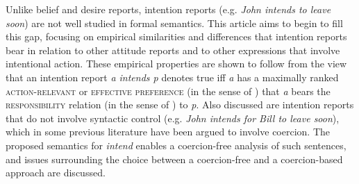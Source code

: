 Unlike belief and desire reports, intention reports (e.g. \textit{John intends to leave soon}) are not well studied in formal semantics. This article aims to begin to fill this gap, focusing on empirical similarities and differences that intention reports bear in relation to other attitude reports and to other expressions that involve intentional action. These empirical properties are shown to follow from the view that an intention report \textit{a intends p} denotes true iff \textit{a} has a maximally ranked \textsc{action-relevant} or \textsc{effective preference} (in the sense of \cite{condoravdi-lauer2016-semprag}) that \textit{a} bears the \textsc{responsibility} relation (in the sense of \cite{farkas1988-lingphil}) to \textit{p}. Also discussed are intention reports that do not involve syntactic control (e.g. \textit{John intends for Bill to leave soon}), which in some previous literature have been argued to involve coercion. The proposed semantics for \textit{intend} enables a coercion-free analysis of such sentences, and issues surrounding the choice between a coercion-free and a coercion-based approach are discussed.
\endinput